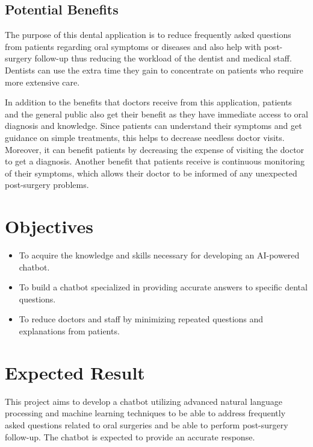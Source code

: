 \documentclass[12pt,oneside,openright,a4paper]{cpe-english-project}
\begin{document}
  \subsection{Potential Benefits}
    \qquad The purpose of this dental application is to reduce frequently asked questions from patients regarding oral symptoms or diseases and also help with post-surgery follow-up thus reducing the workload of the dentist and medical staff. Dentists can use the extra time they gain to concentrate on patients who require more extensive care.\par
    \qquad In addition to the benefits that doctors receive from this application, patients and the general public also get their benefit as they have immediate access to oral diagnosis and knowledge. Since patients can understand their symptoms and get guidance on simple treatments, this helps to decrease needless doctor visits. Moreover, it can benefit patients by decreasing the expense of visiting the doctor to get a diagnosis. Another benefit that patients receive is continuous monitoring of their symptoms, which allows their doctor to be informed of any unexpected post-surgery problems.\par

\section{Objectives}
  \begin{itemize}
    \item To acquire the knowledge and skills necessary for developing an AI-powered chatbot. 
    \item To build a chatbot specialized in providing accurate answers to specific dental questions.
    \item To reduce doctors and staff by minimizing repeated questions and explanations from patients.
  \end{itemize}

\section{Expected Result}
  \qquad This project aims to develop a chatbot utilizing advanced natural language processing and machine learning techniques to be able to address frequently asked questions related to oral surgeries and be able to perform post-surgery follow-up. The chatbot is expected to provide an accurate response. \par  
\end{document}
